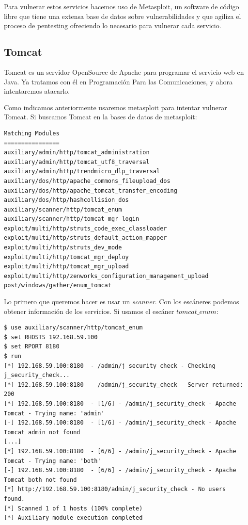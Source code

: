 \documentclass[a4paper,12pt]{scrartcl}
\begin{document}
Para vulnerar estos servicios hacemos uso de Metasploit, un software de código libre que tiene una extensa base de datos sobre vulnerabilidades y que agiliza el proceso de pentesting ofreciendo lo necesario para vulnerar cada servicio\cite{metasploit}. 

\subsection{Tomcat}

Tomcat es un servidor OpenSource de Apache para programar el servicio web en Java. Ya tratamos con él en Programación Para las Comunicaciones, y ahora intentaremos atacarlo.


Como indicamos anteriormente usaremos metasploit para intentar vulnerar Tomcat. Si buscamos Tomcat en la bases de datos de metasploit:

\begin{lstlisting}[breaklines]
Matching Modules
================
auxiliary/admin/http/tomcat_administration
auxiliary/admin/http/tomcat_utf8_traversal
auxiliary/admin/http/trendmicro_dlp_traversal
auxiliary/dos/http/apache_commons_fileupload_dos
auxiliary/dos/http/apache_tomcat_transfer_encoding
auxiliary/dos/http/hashcollision_dos
auxiliary/scanner/http/tomcat_enum
auxiliary/scanner/http/tomcat_mgr_login
exploit/multi/http/struts_code_exec_classloader
exploit/multi/http/struts_default_action_mapper
exploit/multi/http/struts_dev_mode
exploit/multi/http/tomcat_mgr_deploy
exploit/multi/http/tomcat_mgr_upload
exploit/multi/http/zenworks_configuration_management_upload
post/windows/gather/enum_tomcat
\end{lstlisting}

Lo primero que queremos hacer es usar un \textit{scanner}. Con los escáneres podemos obtener información de los servicios. Si usamos el escáner $tomcat\_enum$:


\begin{lstlisting}[breaklines]
$ use auxiliary/scanner/http/tomcat_enum
$ set RHOSTS 192.168.59.100
$ set RPORT 8180
$ run
[*] 192.168.59.100:8180  - /admin/j_security_check - Checking j_security_check...
[*] 192.168.59.100:8180  - /admin/j_security_check - Server returned: 200
[*] 192.168.59.100:8180  - [1/6] - /admin/j_security_check - Apache Tomcat - Trying name: 'admin'
[-] 192.168.59.100:8180  - [1/6] - /admin/j_security_check - Apache Tomcat admin not found
[...]
[*] 192.168.59.100:8180  - [6/6] - /admin/j_security_check - Apache Tomcat - Trying name: 'both'
[-] 192.168.59.100:8180  - [6/6] - /admin/j_security_check - Apache Tomcat both not found
[*] http://192.168.59.100:8180/admin/j_security_check - No users found.
[*] Scanned 1 of 1 hosts (100% complete)
[*] Auxiliary module execution completed
\end{lstlisting}
\end{document}
